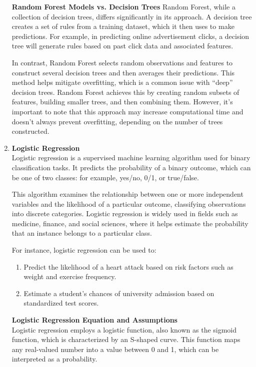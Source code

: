 \begin{enumerate}
\textbf{Random Forest Models vs. Decision Trees}
Random Forest, while a collection of decision trees, differs significantly in its approach. A decision tree creates a set of rules from a training dataset, which it then uses to make predictions. For example, in predicting online advertisement clicks, a decision tree will generate rules based on past click data and associated features.

In contrast, Random Forest selects random observations and features to construct several decision trees and then averages their predictions. This method helps mitigate overfitting, which is a common issue with “deep” decision trees. Random Forest achieves this by creating random subsets of features, building smaller trees, and then combining them. However, it’s important to note that this approach may increase computational time and doesn't always prevent overfitting, depending on the number of trees constructed.

\item \textbf{Logistic Regression} \\
Logistic regression is a supervised machine learning algorithm used for binary classification tasks. It predicts the probability of a binary outcome, which can be one of two classes: for example, yes/no, 0/1, or true/false.

This algorithm examines the relationship between one or more independent variables and the likelihood of a particular outcome, classifying observations into discrete categories. Logistic regression is widely used in fields such as medicine, finance, and social sciences, where it helps estimate the probability that an instance belongs to a particular class.

For instance, logistic regression can be used to:
\begin{enumerate}
	\item Predict the likelihood of a heart attack based on risk factors such as weight and exercise frequency.
	\item Estimate a student's chances of university admission based on standardized test scores.
\end{enumerate}

\textbf{Logistic Regression Equation and Assumptions} \\
Logistic regression employs a logistic function, also known as the sigmoid function, which is characterized by an S-shaped curve. This function maps any real-valued number into a value between 0 and 1, which can be interpreted as a probability.


\end{enumerate}
